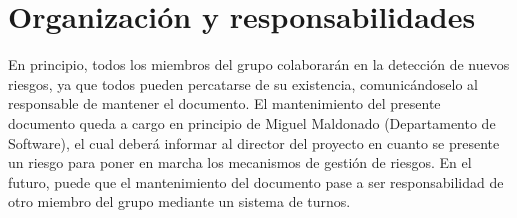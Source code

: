 \chapter{Organización y responsabilidades}
En principio, todos los miembros del grupo colaborarán en la detección de nuevos riesgos, ya que todos pueden percatarse de su existencia, comunicándoselo al responsable de mantener el documento. El mantenimiento del presente documento queda a cargo en principio de Miguel Maldonado (Departamento de Software), el cual deberá informar al director del proyecto en cuanto se presente un riesgo para poner en marcha los mecanismos de gestión de riesgos. En el futuro, puede que el mantenimiento del documento pase a ser responsabilidad de otro miembro del grupo mediante un sistema de turnos.
